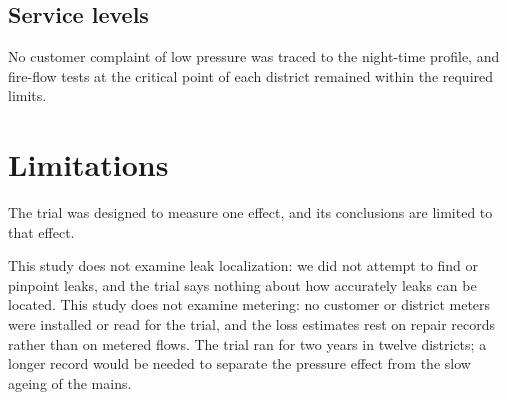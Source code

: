 \documentclass{article}
\begin{document}
\subsection{Service levels}
\label{sec:results-service}

No customer complaint of low pressure was traced to the night-time profile, and
fire-flow tests at the critical point of each district remained within the
required limits.

\section{Limitations}
\label{sec:limitations}

The trial was designed to measure one effect, and its conclusions are limited
to that effect.

This study does not examine leak localization: we did not attempt to find or
pinpoint leaks, and the trial says nothing about how accurately leaks can be
located. This study does not examine metering: no customer or district meters
were installed or read for the trial, and the loss estimates rest on repair
records rather than on metered flows. The trial ran for two years in twelve
districts; a longer record would be needed to separate the pressure effect from
the slow ageing of the mains.
\end{document}
